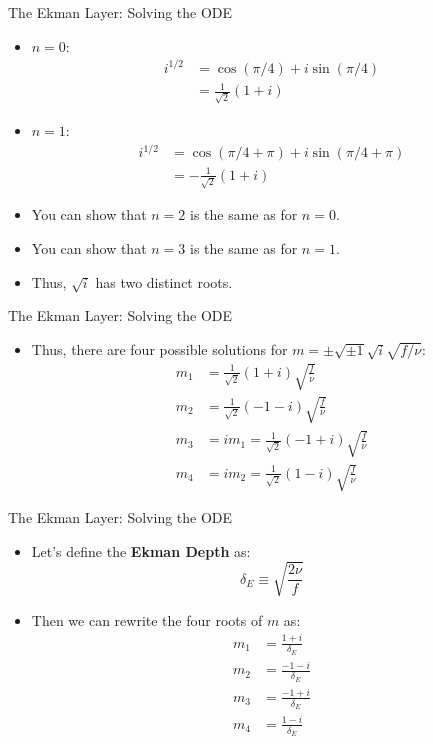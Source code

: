 \begin{frame}{The Ekman Layer: Solving the ODE}

\begin{itemize}
	\item $n=0$:
	\begin{align*}
		i^{1/2} &= \cos{(\pi/4)} + i\sin{(\pi/4)}\\
		&= \frac{1}{\sqrt{2}} (1+i)
	\end{align*}
	\item $n=1$:
	\begin{align*}
		i^{1/2} &= \cos{(\pi/4 + \pi)} + i\sin{(\pi/4 + \pi)}\\
		&= -\frac{1}{\sqrt{2}} (1+i)
	\end{align*}
	\item You can show that $n=2$ is the same as for $n=0$.
	\item You can show that $n=3$ is the same as for $n=1$.
	\item Thus, $\sqrt{i}$ has two distinct roots.
\end{itemize}
\end{frame}
\begin{frame}{The Ekman Layer: Solving the ODE}

\begin{itemize}
	\item Thus, there are four possible solutions for $m=\pm \sqrt{\pm 1} \sqrt{i} \sqrt{f/\nu}$:
	\begin{align*}
	m_1 &= \frac{1}{\sqrt{2}} (1+i)\sqrt{\frac{f}{\nu}}\\
	m_2 &= \frac{1}{\sqrt{2}} (-1-i)\sqrt{\frac{f}{\nu}}\\
	m_3 &= im_1 = \frac{1}{\sqrt{2}} (-1+i)\sqrt{\frac{f}{\nu}}\\
	m_4 &= im_2 = \frac{1}{\sqrt{2}} (1-i)\sqrt{\frac{f}{\nu}}
	\end{align*}
\end{itemize}
\end{frame}
\begin{frame}{The Ekman Layer: Solving the ODE}

\begin{itemize}
	\item Let's define the \textbf{Ekman Depth} as:
	$$\delta_E \equiv\sqrt{\frac{2\nu}{f}}$$
	\item Then we can rewrite the four roots of $m$ as:
	\begin{align*}
	m_1 &= \frac{1+i}{\delta_E}\\
	m_2 &= \frac{-1-i}{\delta_E}\\
	m_3 &= \frac{-1+i}{\delta_E}\\
	m_4 &= \frac{1-i}{\delta_E}	
	\end{align*}

\end{itemize}
\end{frame}
